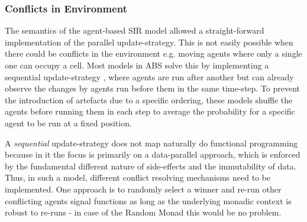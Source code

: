 \subsubsection{Conflicts in Environment}
The semantics of the agent-based SIR model allowed a straight-forward implementation of the parallel update-strategy. This is not easily possible when there could be conflicts in the environment e.g. moving agents where only a single one can occupy a cell. Most models in ABS \cite{epstein_growing_1996} solve this by implementing a sequential update-strategy \cite{thaler_art_2017}, where agents are run after another but can already observe the changes by agents run before them in the same time-step. To prevent the introduction of artefacts due to a specific ordering, these models shuffle the agents before running them in each step to average the probability for a specific agent to be run at a fixed position.

A \textit{sequential} update-strategy does not map naturally do functional programming because in it the focus is primarily on a data-parallel approach, which is enforced by the fundamental different nature of side-effects and the immutability of data. Thus, in such a model, different conflict resolving mechanisms need to be implemented. One approach is to randomly select a winner and re-run other conflicting agents signal functions as long as the underlying monadic context is robust to re-runs - in case of the Random Monad this would be no problem.